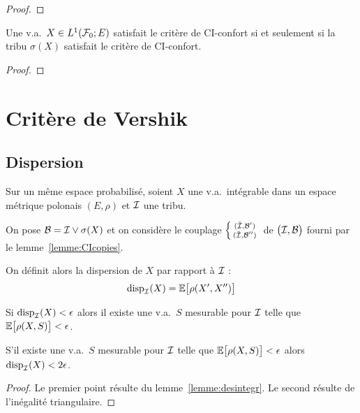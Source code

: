 \documentclass[12pt,a4paper]{article}
\begin{document}
\begin{proof}

\end{proof}

\begin{ppsition}\label{ppsition:CItribu}
Une v.a.\ $X \in L^1(\mathcal{F}_0; E)$ satisfait le critère de CI-confort si 
et seulement si la tribu $\sigma(X)$ satisfait le critère de CI-confort. 
\end{ppsition}

\begin{proof}

\end{proof}

\section{Critère de Vershik}

\subsection{Dispersion}

Sur un m\^eme espace probabilisé, soient $X$ une v.a.\ intégrable 
dans un espace métrique polonais $(E,\rho)$ et $\mathcal{I}$ une tribu. 

On pose $\mathcal{B}= \mathcal{I} \vee \sigma(X)$ et on considère le couplage 
 $\left\{\begin{smallmatrix} 
(\bar {\mathcal{I}}, \mathcal{B}')
\\ 
(\bar {\mathcal{I}}, \mathcal{B}'')
\end{smallmatrix}\right.$ 
de $\bigl(\mathcal{I}, \mathcal{B}\bigr)$ fourni par le lemme~\ref{lemme:CIcopies}. 

On définit alors la dispersion de $X$ par rapport à $\mathcal{I}$ :
$$
\textrm{disp}_{\mathcal{I}}(X) = \mathbb{E}\bigl[\rho(X', X'') \bigr]
$$

\begin{lemme}\label{lemme:dispersion}
Si $\textrm{disp}_{\mathcal{I}}(X) < \epsilon$ alors il existe une v.a.\ $S$ mesurable pour $\mathcal{I}$ 
telle que  $\mathbb{E}\bigl[\rho(X, S) \bigr] < \epsilon$. 

S'il existe  une v.a.\ $S$ mesurable pour $\mathcal{I}$ 
telle que  $\mathbb{E}\bigl[\rho(X, S) \bigr] < \epsilon$ alors 
 $\textrm{disp}_{\mathcal{I}}(X) < 2\epsilon$.
\end{lemme}

\begin{proof}
Le premier point résulte du lemme~\ref{lemme:desintegr}. 
Le second résulte de l'inégalité triangulaire. 
\end{proof}
\end{document}

